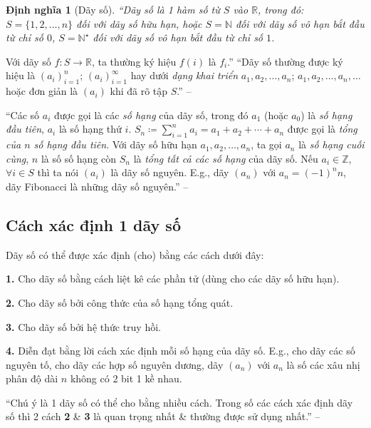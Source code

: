 \documentclass[oneside]{book}
\numberwithin{equation}{section}
\newtheorem{dinhnghia}{Định nghĩa}[section]
\begin{document}
\begin{dinhnghia}[Dãy số]
	``\emph{Dãy số} là 1 hàm số từ $S$ vào $\mathbb{R}$, trong đó: $S = \{1,2,\ldots,n\}$ đối với \emph{dãy số hữu hạn}, hoặc $S = \mathbb{N}$ đối với \emph{dãy số vô hạn} bắt đầu từ chỉ số $0$, $S = \mathbb{N}^\star$ đối với dãy số vô hạn bắt đầu từ chỉ số $1$.
\end{dinhnghia}
Với dãy số $f:S\to\mathbb{R}$, ta thường ký hiệu $f(i)$ là $f_i$.'' ``Dãy số thường được ký hiệu là $(a_i)_{i=1}^n$; $(a_i)_{i=1}^\infty$ hay dưới \textit{dạng khai triển} $a_1,a_2,\ldots,a_n$; $a_1,a_2,\ldots,a_n,\ldots$ hoặc đơn giản là $(a_i)$ khi đã rõ tập $S$.'' -- \cite[p. 117]{TL_chuyen_Toan_Dai_So_Giai_Tich_11}

``Các số $a_i$ được gọi là các \textit{số hạng} của dãy số, trong đó $a_1$ (hoặc $a_0$) là \textit{số hạng đầu tiên}, $a_i$ là số hạng thứ $i$. $S_n\coloneqq\sum_{i=1}^n a_i = a_1 + a_2 + \cdots + a_n$ được gọi là \textit{tổng của $n$ số hạng đầu tiên}. Với dãy số hữu hạn $a_1,a_2,\ldots,a_n$, ta gọi $a_n$ là \textit{số hạng cuối cùng}, $n$ là số số hạng còn $S_n$ là \textit{tổng tất cả các số hạng} của dãy số. Nếu $a_i\in\mathbb{Z}$, $\forall i\in S$ thì ta nói $(a_i)$ là dãy số nguyên. E.g., dãy $(a_n)$ với $a_n = (-1)^nn$, dãy Fibonacci là những dãy số nguyên.'' -- \cite[p. 118]{TL_chuyen_Toan_Dai_So_Giai_Tich_11}

\subsection{Cách xác định 1 dãy số}
Dãy số có thể được xác định (cho) bằng các cách dưới đây:
\begin{enumerate*}
	\item[\textbf{1.}] Cho dãy số bằng cách liệt kê các phần tử (dùng cho các dãy số hữu hạn).
	\item[\textbf{2.}] Cho dãy số bởi công thức của số hạng tổng quát.
	\item[\textbf{3.}] Cho dãy số bởi hệ thức truy hồi.
	\item[\textbf{4.}] Diễn đạt bằng lời cách xác định mỗi số hạng của dãy số. E.g., cho dãy các số nguyên tố, cho dãy các hợp số nguyên dương, dãy $(a_n)$ với $a_n$ là số các xâu nhị phân độ dài $n$ không có 2 bit 1 kề nhau.
\end{enumerate*}

``Chú ý là 1 dãy số có thể cho bằng nhiều cách. Trong số các cách xác định dãy số thì 2 cách \textbf{2} \& \textbf{3} là quan trọng nhất \& thường được sử dụng nhất.'' -- \cite[p. 119]{TL_chuyen_Toan_Dai_So_Giai_Tich_11}
\end{document}

